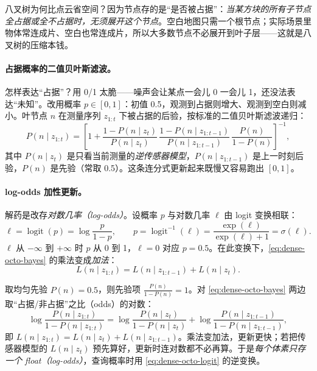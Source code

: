 八叉树为何比点云省空间？因为节点存的是“是否被占据”：\emph{当某方块的所有子节点全占据或全不占据时，无须展开这个节点}。空白地图只需一个根节点；实际场景里物体常连成片、空白也常连成片，所以大多数节点不必展开到叶子层——这就是八叉树的压缩本钱。

\paragraph{占据概率的二值贝叶斯滤波。}
怎样表达“占据”？用 0/1 太脆——噪声会让某点一会儿 0 一会儿 1，还没法表达“未知”。改用概率 $p\in[0,1]$：初值 0.5，观测到占据则增大、观测到空白则减小。叶节点 $n$ 在测量序列 $z_{1:t}$ 下被占据的后验，按标准的二值贝叶斯滤波递归\cite{hornung2013octomap}：
\begin{equation}
  P(n\mid z_{1:t})=\left[1+\frac{1-P(n\mid z_t)}{P(n\mid z_t)}\,\frac{1-P(n\mid z_{1:t-1})}{P(n\mid z_{1:t-1})}\,\frac{P(n)}{1-P(n)}\right]^{-1},
  \label{eq:dense-octo-bayes}
\end{equation}
其中 $P(n\mid z_t)$ 是只看当前测量的\emph{逆传感器模型}，$P(n\mid z_{1:t-1})$ 是上一时刻后验，$P(n)$ 是先验（常取 0.5）。这条连分式更新起来既慢又容易跑出 $[0,1]$。

\paragraph{log-odds 加性更新。}
解药是改存\emph{对数几率（log-odds）}。设概率 $p$ 与对数几率 $\ell$ 由 logit 变换相联：
\begin{equation}
  \ell=\operatorname{logit}(p)=\log\!\frac{p}{1-p},\qquad
  p=\operatorname{logit}^{-1}(\ell)=\frac{\exp(\ell)}{\exp(\ell)+1}=\sigma(\ell).
  \label{eq:dense-octo-logit}
\end{equation}
$\ell$ 从 $-\infty$ 到 $+\infty$ 时 $p$ 从 0 到 1，$\ell=0$ 对应 $p=0.5$。在此变换下，\cref{eq:dense-octo-bayes} 的乘法变成\emph{加法}：
\begin{equation}
  L(n\mid z_{1:t})=L(n\mid z_{1:t-1})+L(n\mid z_t).
  \label{eq:dense-octo-logodds}
\end{equation}

\begin{derivation}
取均匀先验 $P(n)=0.5$，则先验项 $\frac{P(n)}{1-P(n)}=1$。对 \cref{eq:dense-octo-bayes} 两边取“占据/非占据”之比（odds）的对数：
\[
  \log\frac{P(n\mid z_{1:t})}{1-P(n\mid z_{1:t})}
  =\log\frac{P(n\mid z_t)}{1-P(n\mid z_t)}+\log\frac{P(n\mid z_{1:t-1})}{1-P(n\mid z_{1:t-1})},
\]
即 $L(n\mid z_{1:t})=L(n\mid z_t)+L(n\mid z_{1:t-1})$。乘法变加法，更新更快；若把传感器模型的 $L(n\mid z_t)$ 预先算好，更新时连对数都不必再算。于是\emph{每个体素只存一个 float（log-odds）}，查询概率时用 \cref{eq:dense-octo-logit} 的逆变换。
\end{derivation}

